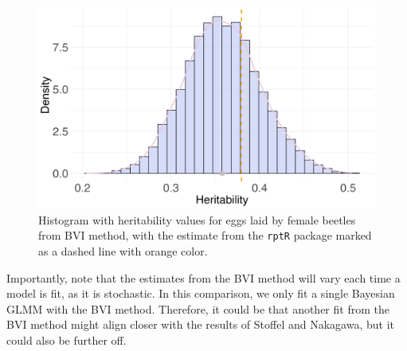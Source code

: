 \begin{figure}[H]
  \centering
  \includegraphics[width=1\linewidth]{Figures/Stoffel Comparison/Heritability_egg_poisson.png}
  \caption[Estimated repeatability of eggs laid by female beetles]{Histogram with heritability values for eggs laid by female beetles from BVI method, with the estimate from the \texttt{rptR} package marked as a dashed line with orange color.}
  \label{fig:heritability_eggs_poisson}
\end{figure}
\noindent Importantly, note that the estimates from the BVI method will vary each time a model is fit, as it is stochastic. In this comparison, we only fit a single Bayesian GLMM with the BVI method. Therefore, it could be that another fit from the BVI method might align closer with the results of Stoffel and Nakagawa, but it could also be further off. 

